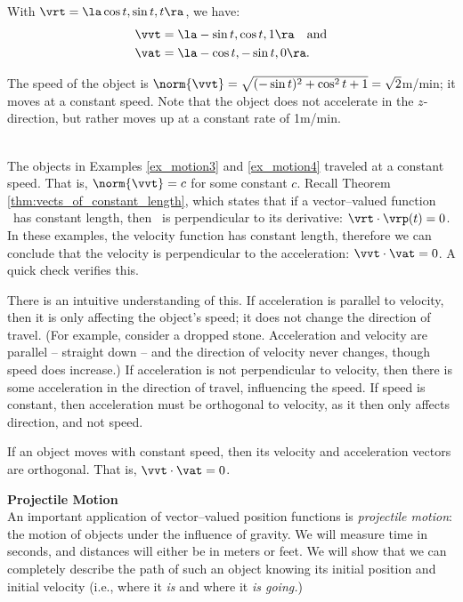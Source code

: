 {With $\vrt = \la \cos t,\sin t, t\ra$, we have:
\begin{align*}
\vvt &= \la -\sin t, \cos t, 1\ra \quad \text{and} \\
\vat &= \la -\cos t, -\sin t, 0\ra.
\end{align*}

The speed of the object is $\norm{\vvt} = \sqrt{(-\sin t)^2+\cos^2t+1} = \sqrt{2}$m/min; it moves at a constant speed. Note that the object does not accelerate in the $z$-direction, but rather moves up at a constant rate of 1m/min.
}\\

The objects in Examples \ref{ex_motion3} and \ref{ex_motion4} traveled at a constant speed. That is, $\norm{\vvt} = c$ for some constant $c$. Recall Theorem \ref{thm:vects_of_constant_length}, which states that if a vector--valued function \vrt\ has constant length, then \vrt\ is perpendicular to its derivative: $\vrt\cdot\vrp(t) = 0$. In these examples, the velocity function has constant length, therefore we can conclude that the velocity is perpendicular to the acceleration: $\vvt\cdot\vat = 0$. A quick check verifies this.

There is an intuitive understanding of this. If acceleration is parallel to velocity, then it is only affecting the object's speed; it does not change the direction of travel. (For example, consider a dropped stone. Acceleration and velocity are parallel -- straight down -- and the direction of velocity never changes, though speed does increase.) If acceleration is not perpendicular to velocity, then there is some acceleration in the direction of travel, influencing the speed. If speed is constant, then acceleration must be orthogonal to velocity, as it then only affects direction, and not speed.

{If an object moves with constant speed, then its velocity and acceleration vectors are orthogonal. That is, $\vvt\cdot\vat=0$.
}


\noindent\textbf{\large Projectile Motion}\\

An important application of vector--valued position functions is \emph{projectile motion}: the motion of objects under the influence of gravity. We will measure time in seconds, and distances will either be in meters or feet. We will show that we can completely describe the path of such an object knowing its initial position and initial velocity (i.e., where it \emph{is} and where it \emph{is going.})


